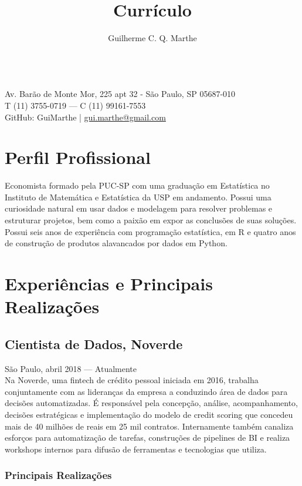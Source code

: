 \documentclass{article}
\author{Guilherme C. Q. Marthe}
\title{Currículo}
\makeatletter
\renewcommand{\maketitle}{
\begin{flushleft}
	{\huge\theauthor}
	\vspace{0.2em}\\
	Av. Barão de Monte Mor, 225 apt 32 - São Paulo, SP 05687-010\\
	T (11) 3755-0719 --- C (11) 99161-7553\\
	GitHub: GuiMarthe | \href{mailto:gui.marthe@gmail.com}{gui.marthe@gmail.com}
\end{flushleft}
}
\newcommand{\jobdate}[3]{
\large
\vspace{0.05em} 
  {#1, #2 --- #3}
\vspace{0.5em} 
\\
}
\makeatother
\begin{document}
\maketitle

\section{Perfil Profissional}

 \linespread{.99}\large{Economista formado pela PUC-SP com uma graduação em Estatística no Instituto de Matemática e Estatística da USP em andamento. Possui uma curiosidade natural em usar dados e modelagem para resolver problemas e estruturar projetos, bem como a paixão em expor as conclusões de suas soluções.  Possui seis anos de experiência com programação estatística, em R e quatro anos de construção de produtos alavancados por dados em Python. }

\vspace{0.1em}

\section{Experiências e Principais Realizações}

\subsection{Cientista de Dados, Noverde}
\jobdate{São Paulo}{abril 2018}{Atualmente}
Na Noverde, uma fintech de crédito pessoal iniciada em 2016, trabalha conjuntamente com as lideranças da empresa a conduzindo área de dados para decisões automatizadas. É responsável pela concepção, análise, acompanhamento, decisões estratégicas e implementação do modelo de credit scoring que concedeu mais de 40 milhões de reais em 25 mil contratos. Internamente também canaliza esforços para automatização de tarefas, construções de pipelines de BI e realiza workshops internos para difusão de ferramentas e tecnologias que utiliza.

\subsubsection{Principais Realizações}
\end{document}
